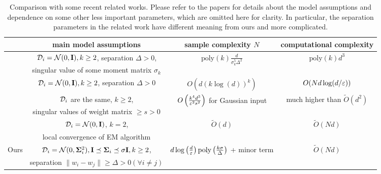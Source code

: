 \begin{table}
	\centering
\scriptsize
		\begin{tabular}{c| c| c | c}
		\hline
			    & main model assumptions  &  sample complexity $N$   & computational complexity \\
		 \hline
\multirow{2}{*}{\citep{yi2016solving}}  &  $\mathcal{D}_i = \mathcal{N}(0, \bold{I}), k \ge 2$,  separation $\Delta > 0$,  & \multirow{2}{*}{ $\text{poly}(k) \frac{d}{\sigma_k^5 \Delta^2} $ }          &   \multirow{2}{*}{$\text{poly}(k) d^3$ } \\
    & singular value of some moment matrix $\sigma_k$ & & 
\\ \hline
\citep{zhong2016mixed}  &  $\mathcal{D}_i = \mathcal{N}(0, \bold{I}), k \ge 2$, separation $\Delta > 0$          &  $ O(d (k \log(d))^k)$ & $O(Nd \log(d/\varepsilon))$ 
\\ \hline
\multirow{2}{*}{\citep{sedghi2016provable}}  &  $\mathcal{D}_i$ are the same, $k \ge 2$,  &  \multirow{2}{*}{$O\left(\frac{k^4 d^3}{\varepsilon^2 s^2}\right) $ for Gaussian input} & \multirow{2}{*}{much higher than $\tilde{O}(d^2)$ }
\\
& singular values of weight matrix $\ge s>0$ & &
\\ \hline
\multirow{2}{*}{\citep{klusowski2017estimating}} & $\mathcal{D}_i = \mathcal{N}(0, \bold{I})$, $k = 2$, & \multirow{2}{*}{$\tilde{O}(d)$}  & \multirow{2}{*}{$\tilde{O}(Nd)$ }
\\
& local convergence of EM algorithm  & &
\\ \hline \hline
		 \multirow{2}{*}{Ours}   &  $\mathcal{D}_i = \mathcal{N}(0, \bold{\Sigma}_i^2), \bold{I} \preceq \bold{\Sigma}_i \preceq \sigma\bold{I}, k \ge 2$, &  \multirow{2}{*}{$ d \log\left(\frac{d}{\varepsilon}\right) \textrm{poly}\left(\frac{k\sigma}{\Delta} \right)$ + minor term}   & \multirow{2}{*}{$\tilde{O}(Nd)$  }
		\\
		& separation $\|w_i - w_j\| \ge \Delta > 0 (\forall i\neq j)$&  
		\\
		\hline
		\end{tabular}
	\caption{Comparison with some recent related works. Please refer to the papers for details about the model assumptions and dependence on some other less important parameters, which are omitted here for clarity. In particular, the separation parameters in the related work have different meaning from ours and more complicated. }
	\label{tab:previous}
\end{table}
\normalsize

